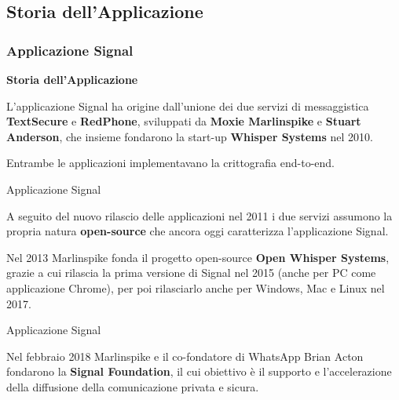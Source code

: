 \subsection{Storia dell'Applicazione}

\begin{frame}
    \frametitle{Applicazione Signal}
    \textbf{Storia dell'Applicazione}
    \newline
    
    L’applicazione Signal ha origine dall’unione dei due servizi di messaggistica \textbf{TextSecure} e \textbf{RedPhone}, sviluppati da \textbf{Moxie Marlinspike} e \textbf{Stuart Anderson}, che insieme fondarono la start-up \textbf{Whisper Systems} nel 2010.\newline \pause

    Entrambe le applicazioni implementavano la crittografia end-to-end.

\end{frame}

\begin{frame}{Applicazione Signal}

    A seguito del nuovo rilascio delle applicazioni nel 2011 i due servizi assumono la propria natura \textbf{open-source} che ancora oggi caratterizza l’applicazione Signal.\newline \pause
    
    Nel 2013 Marlinspike fonda il progetto open-source \textbf{Open Whisper Systems}, grazie a cui rilascia la prima versione di Signal nel 2015 (anche per PC come applicazione Chrome), per poi rilasciarlo anche per Windows, Mac e Linux nel 2017. \newline
    
\end{frame}

\begin{frame}{Applicazione Signal}

  Nel febbraio 2018 Marlinspike e il co-fondatore di WhatsApp Brian Acton fondarono la \textbf{Signal Foundation}, il cui obiettivo è il supporto e l’accelerazione della diffusione della comunicazione privata e sicura.
  \cite{Lumb}
    
\end{frame}
